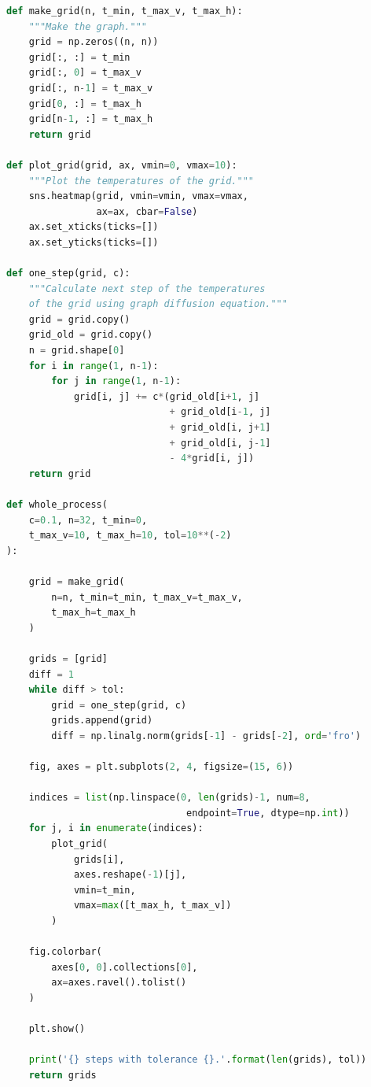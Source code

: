 \documentclass{article}
\begin{document}
        \begin{lstlisting}[language=Python]
def make_grid(n, t_min, t_max_v, t_max_h):
    """Make the graph."""
    grid = np.zeros((n, n))
    grid[:, :] = t_min
    grid[:, 0] = t_max_v
    grid[:, n-1] = t_max_v
    grid[0, :] = t_max_h
    grid[n-1, :] = t_max_h
    return grid

def plot_grid(grid, ax, vmin=0, vmax=10):
    """Plot the temperatures of the grid."""
    sns.heatmap(grid, vmin=vmin, vmax=vmax,
                ax=ax, cbar=False)
    ax.set_xticks(ticks=[])
    ax.set_yticks(ticks=[])

def one_step(grid, c):
    """Calculate next step of the temperatures
    of the grid using graph diffusion equation."""
    grid = grid.copy()
    grid_old = grid.copy()
    n = grid.shape[0]
    for i in range(1, n-1):
        for j in range(1, n-1):
            grid[i, j] += c*(grid_old[i+1, j]
                             + grid_old[i-1, j]
                             + grid_old[i, j+1]
                             + grid_old[i, j-1]
                             - 4*grid[i, j])
    return grid

def whole_process(
    c=0.1, n=32, t_min=0,
    t_max_v=10, t_max_h=10, tol=10**(-2)
):
    
    grid = make_grid(
        n=n, t_min=t_min, t_max_v=t_max_v,
        t_max_h=t_max_h
    )
    
    grids = [grid]
    diff = 1
    while diff > tol:
        grid = one_step(grid, c)
        grids.append(grid)
        diff = np.linalg.norm(grids[-1] - grids[-2], ord='fro')
    
    fig, axes = plt.subplots(2, 4, figsize=(15, 6))

    indices = list(np.linspace(0, len(grids)-1, num=8,
                                endpoint=True, dtype=np.int))
    for j, i in enumerate(indices):
        plot_grid(
            grids[i],
            axes.reshape(-1)[j],
            vmin=t_min,
            vmax=max([t_max_h, t_max_v])
        )
            
    fig.colorbar(
        axes[0, 0].collections[0],
        ax=axes.ravel().tolist()
    )
    
    plt.show()
    
    print('{} steps with tolerance {}.'.format(len(grids), tol))
    return grids
        \end{lstlisting}
\end{document}

